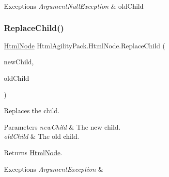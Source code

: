 \begin{DoxyExceptions}{Exceptions}
{\em Argument\+Null\+Exception} & old\+Child\\
\hline
\end{DoxyExceptions}
\mbox{\label{class_html_agility_pack_1_1_html_node_a17e6fac6c6e8189d1aae612fe66a9924}} 
\subsubsection{\texorpdfstring{Replace\+Child()}{ReplaceChild()}}
{\footnotesize\ttfamily \hyperlink{class_html_agility_pack_1_1_html_node}{Html\+Node} Html\+Agility\+Pack.\+Html\+Node.\+Replace\+Child (\begin{DoxyParamCaption}\item[{\hyperlink{class_html_agility_pack_1_1_html_node}{Html\+Node}}]{new\+Child,  }\item[{\hyperlink{class_html_agility_pack_1_1_html_node}{Html\+Node}}]{old\+Child }\end{DoxyParamCaption})\hspace{0.3cm}{\ttfamily [inline]}}



Replaces the child. 


\begin{DoxyParams}{Parameters}
{\em new\+Child} & The new child.\\
\hline
{\em old\+Child} & The old child.\\
\hline
\end{DoxyParams}
\begin{DoxyReturn}{Returns}
\hyperlink{class_html_agility_pack_1_1_html_node}{Html\+Node}.
\end{DoxyReturn}

\begin{DoxyExceptions}{Exceptions}
{\em Argument\+Exception} & \\
\hline
\end{DoxyExceptions}
\mbox{\label{class_html_agility_pack_1_1_html_node_a318c0ba0b18bd3e02cd71d28eded83ab}} 
